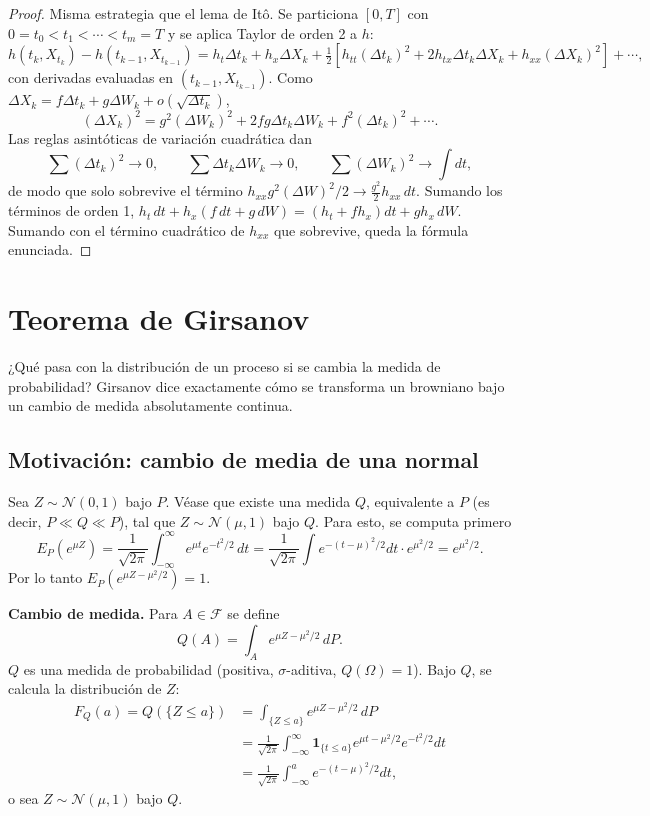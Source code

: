 \documentclass[11pt, a4paper]{article}
\begin{document}
\begin{proof}
Misma estrategia que el lema de Itô. Se particiona $[0, T]$ con $0 = t_0 < t_1 < \cdots < t_m =
T$ y se aplica Taylor de orden 2 a $h$:
$$ h(t_k, X_{t_k}) - h(t_{k-1}, X_{t_{k-1}}) = h_t \Delta t_k + h_x \Delta X_k + \tfrac{1}{2}
[h_{tt} (\Delta t_k)^2 + 2 h_{tx} \Delta t_k \Delta X_k + h_{xx} (\Delta X_k)^2] + \cdots, $$
con derivadas evaluadas en $(t_{k-1}, X_{t_{k-1}})$. Como $\Delta X_k = f \Delta t_k + g \Delta W_k
+ o(\sqrt{\Delta t_k})$,
$$ (\Delta X_k)^2 = g^2 (\Delta W_k)^2 + 2 f g \Delta t_k \Delta W_k + f^2 (\Delta t_k)^2 +
\cdots. $$
Las reglas asintóticas de variación cuadrática dan
$$ \sum (\Delta t_k)^2 \to 0, \qquad \sum \Delta t_k \Delta W_k \to 0, \qquad \sum (\Delta W_k)^2
\to \int dt, $$
de modo que solo sobrevive el término $h_{xx} g^2 (\Delta W)^2 / 2 \to \tfrac{g^2}{2} h_{xx} \, dt$.
Sumando los términos de orden 1, $h_t \, dt + h_x (f \, dt + g \, dW) = (h_t + f h_x) dt + g h_x
\, dW$. Sumando con el término cuadrático de $h_{xx}$ que sobrevive, queda la fórmula
enunciada.
\end{proof}

\newpage

\section{Teorema de Girsanov}

¿Qué pasa con la distribución de un proceso si se cambia la medida de probabilidad?
Girsanov dice exactamente cómo se transforma un browniano bajo un cambio de medida
absolutamente continua.

\subsection{Motivación: cambio de media de una normal}

Sea $Z \sim \mathcal{N}(0, 1)$ bajo $P$. Véase que existe una medida $Q$, equivalente a $P$ (es
decir, $P \ll Q \ll P$), tal que $Z \sim \mathcal{N}(\mu, 1)$ bajo $Q$. Para esto, se computa
primero
$$ E_P(e^{\mu Z}) = \frac{1}{\sqrt{2\pi}} \int_{-\infty}^\infty e^{\mu t} e^{-t^2/2} \, dt =
\frac{1}{\sqrt{2\pi}} \int e^{-(t-\mu)^2/2} dt \cdot e^{\mu^2/2} = e^{\mu^2/2}. $$
Por lo tanto $E_P(e^{\mu Z - \mu^2/2}) = 1$.

\textbf{Cambio de medida.} Para $A \in \mathcal{F}$ se define
$$ Q(A) = \int_A e^{\mu Z - \mu^2/2} \, dP. $$
$Q$ es una medida de probabilidad (positiva, $\sigma$-aditiva, $Q(\Omega) = 1$). Bajo $Q$,
se calcula la distribución de $Z$:
\begin{align*}
F_Q(a) = Q(\{Z \le a\}) &= \int_{\{Z \le a\}} e^{\mu Z - \mu^2/2} \, dP \\
&= \frac{1}{\sqrt{2\pi}} \int_{-\infty}^\infty \mathbf{1}_{\{t \le a\}} e^{\mu t - \mu^2/2}
e^{-t^2/2} dt \\
&= \frac{1}{\sqrt{2\pi}} \int_{-\infty}^a e^{-(t - \mu)^2/2} dt,
\end{align*}
o sea $Z \sim \mathcal{N}(\mu, 1)$ bajo $Q$.
\end{document}
